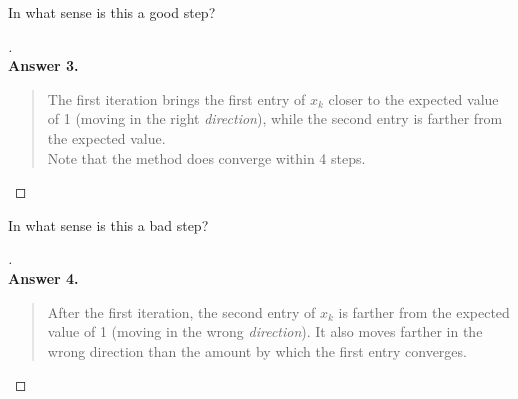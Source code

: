 \documentclass[12pt]{article}
\newenvironment{exercise}[2][Exercise]{\begin{trivlist}
\item[\hskip \labelsep {\bfseries #1}\hskip \labelsep {\bfseries #2.}]}{\end{trivlist}}
\begin{document}
\begin{exercise}{3} In what sense is this a good step?
\end{exercise} \vspace{-10mm}
\begin{proof}[] \textnormal{ } \\
	\textbf{Answer 3.} \vspace{-7mm} \\
	\begin{quote}
		The first iteration brings the first entry of $x_k$ closer to the expected value of 1 (moving in the right \textit{direction}), while the second entry is farther from the expected value. \\
		Note that the method does converge within 4 steps.
	\end{quote}
\end{proof}

\begin{exercise}{4} In what sense is this a bad step?
\end{exercise} \vspace{-10mm}
\begin{proof}[] \textnormal{ } \\
	\textbf{Answer 4.} \vspace{-7mm} \\
	\begin{quote}
		After the first iteration, the second entry of $x_k$ is farther from the expected value of 1 (moving in the wrong \textit{direction}). It also moves farther in the wrong direction than the amount by which the first entry converges.
	\end{quote}
\end{proof}
\end{document}
